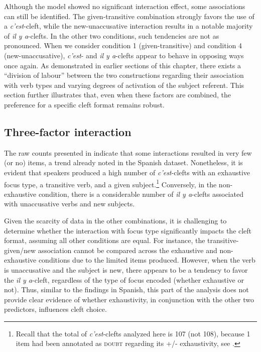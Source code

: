 Although the model showed no significant interaction effect, some associations can still be identified. The given-transitive combination strongly favors the use of a \textit{c'est}-cleft, while the new-unaccusative interaction results in a notable majority of \textit{il y a}-clefts. In the other two conditions, such tendencies are not as pronounced. When we consider condition 1 (given-transitive) and condition 4 (new-unaccusative), \textit{c'est}- and \textit{il y a}-clefts appear to behave in opposing ways once again. As demonstrated in earlier sections of this chapter, there exists a ``division of labour” between the two constructions regarding their association with verb types and varying degrees of activation of the subject referent. This section further illustrates that, even when these factors are combined, the preference for a specific cleft format remains robust.


\subsection{Three-factor interaction} \label{sub:6.9.2}
The raw counts presented in  indicate that some interactions resulted in very few (or no) items, a trend already noted in the Spanish dataset. Nonetheless, it is evident that speakers produced a high number of \textit{c'est}-clefts with an exhaustive focus type, a transitive verb, and a given subject.\footnote{Recall that the total of \textit{c'est}-clefts analyzed here is 107 (not 108), because 1 item had been annotated as \textsc{doubt} regarding its +/- exhaustivity, see .} Conversely, in the non-exhaustive condition, there is a considerable number of \textit{il y a}-clefts associated with unaccusative verbs and new subjects.

Given the scarcity of data in the other combinations, it is challenging to determine whether the interaction with focus type significantly impacts the cleft format, assuming all other conditions are equal. For instance, the transitive-given{\slash}new association cannot be compared across the exhaustive and non-exhaustive conditions due to the limited items produced.
However, when the verb is unaccusative and the subject is new, there appears to be a tendency to favor the \textit{il y a}-cleft, regardless of the type of focus encoded (whether exhaustive or not). Thus, similar to the findings in Spanish, this part of the analysis does not provide clear evidence of whether exhaustivity, in conjunction with the other two predictors, influences cleft choice.


